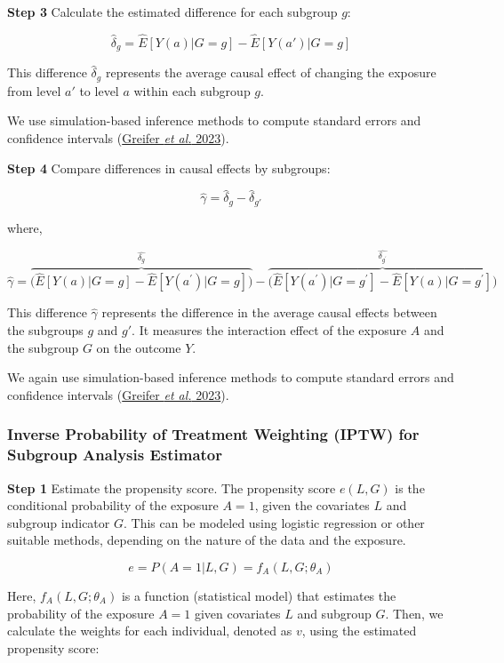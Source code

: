 \documentclass[
  singlecolumn]{article}
\begin{document}
\textbf{Step 3} Calculate the estimated difference for each subgroup
\(g\):

\[\hat{\delta}_g = \hat{E}[Y(a)|G=g] - \hat{E}[Y(a')|G=g]\]

This difference \(\hat{\delta}_g\) represents the average causal effect
of changing the exposure from level \(a'\) to level \(a\) within each
subgroup \(g\).

We use simulation-based inference methods to compute standard errors and
confidence intervals (\hyperref[ref-greifer2023]{Greifer \emph{et al.}
2023}).

\textbf{Step 4} Compare differences in causal effects by subgroups:

\[\hat{\gamma} = \hat{\delta}_g - \hat{\delta}_{g'}\]

where,

\[\hat{\gamma} = \overbrace{\big( \hat{E}[Y(a)|G=g] - \hat{E}[Y(a^{\prime})|G=g] \big)}^{\hat{\delta_g}} - \overbrace{\big(\hat{E}[Y(a^{\prime})|G=g^{\prime}]- \hat{E}[Y(a)|G=g^{\prime}]\big)}^{\hat{\delta_{g^{\prime}}}}\]

This difference \(\hat{\gamma}\) represents the difference in the
average causal effects between the subgroups \(g\) and \(g'\). It
measures the interaction effect of the exposure \(A\) and the subgroup
\(G\) on the outcome \(Y\).

We again use simulation-based inference methods to compute standard
errors and confidence intervals (\hyperref[ref-greifer2023]{Greifer
\emph{et al.} 2023}).

\subsubsection{\texorpdfstring{\textbf{Inverse Probability of Treatment
Weighting (IPTW) for Subgroup Analysis
Estimator}}{Inverse Probability of Treatment Weighting (IPTW) for Subgroup Analysis Estimator}}\label{inverse-probability-of-treatment-weighting-iptw-for-subgroup-analysis-estimator}

\textbf{Step 1} Estimate the propensity score. The propensity score
\(e(L, G)\) is the conditional probability of the exposure \(A = 1\),
given the covariates \(L\) and subgroup indicator \(G\). This can be
modeled using logistic regression or other suitable methods, depending
on the nature of the data and the exposure.

\[e = P(A = 1 | L, G) = f_A(L, G; \theta_A)\]

Here, \(f_A(L, G; \theta_A)\) is a function (statistical model) that
estimates the probability of the exposure \(A = 1\) given covariates
\(L\) and subgroup \(G\). Then, we calculate the weights for each
individual, denoted as \(v\), using the estimated propensity score:
\end{document}
